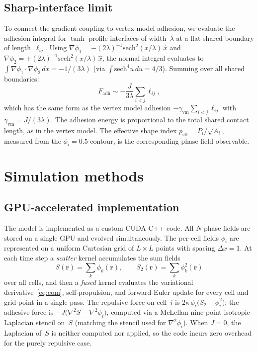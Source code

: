 \documentclass[aps,pre,twocolumn,superscriptaddress,longbibliography,floatfix]{revtex4-2}
\newcommand{\peff}{p_{\mathrm{eff}}}       %
\newcommand{\phii}{\phi_i}                 %
\begin{document}
\subsection{Sharp-interface limit}
\label{sec:model:sharp}

To connect the gradient coupling to vertex model adhesion, we evaluate
the adhesion integral for $\tanh$-profile
interfaces of width~$\lambda$ at a flat shared boundary of
length~$\ell_{ij}$.  Using
$\nabla\phi_1 = -(2\lambda)^{-1}\mathrm{sech}^2(x/\lambda)\,\hat{x}$
and $\nabla\phi_2 = +(2\lambda)^{-1}\mathrm{sech}^2(x/\lambda)\,\hat{x}$,
the normal integral evaluates to
$\int\! \nabla\phi_1\!\cdot\!\nabla\phi_2\,dx = -1/(3\lambda)$
(via $\int\!\mathrm{sech}^4 u\,du = 4/3$).  Summing over all shared
boundaries:
%
\begin{equation}
  F_{\mathrm{adh}} \sim -\frac{J}{3\lambda}\sum_{i<j}\ell_{ij},
  \label{eq:sharp-interface}
\end{equation}
%
which has the same form as the vertex model adhesion
$-\gamma_{\mathrm{vm}}\sum_{i<j}\ell_{ij}$ with
$\gamma_{\mathrm{vm}} = J/(3\lambda)$.  The adhesion energy is
proportional to the total shared contact length, as in the
vertex model.  The effective shape index
$\peff = P_i/\sqrt{A_i}$, measured from the $\phii = 0.5$ contour,
is the corresponding phase field observable.


\section{Simulation methods}
\label{sec:methods}

\subsection{GPU-accelerated implementation}
\label{sec:methods:gpu}

The model is implemented as a custom CUDA C++ code.  All $N$ phase fields
are stored on a single GPU and evolved simultaneously.  The per-cell fields
$\phii$ are represented on a uniform Cartesian grid of $L \times L$ points
with spacing $\Delta x = 1$.  At each time step a \emph{scatter} kernel
accumulates the sum fields
%
\begin{equation}
  S(\bm{r}) = \textstyle\sum_k \phi_k(\bm{r}), \qquad
  S_2(\bm{r}) = \textstyle\sum_k \phi_k^2(\bm{r})
  \label{eq:sum-fields}
\end{equation}
%
over all cells, and then a \emph{fused} kernel evaluates the
variational derivative~\eqref{eq:eom}, self-propulsion, and
forward-Euler update for every cell and grid point in a single pass.
The repulsive force on cell~$i$ is
$2\kappa\,\phii\bigl(S_2 - \phii^2\bigr)$; the adhesive force is
$-J\bigl(\nabla^2 S - \nabla^2\phii\bigr)$, computed via a
McLellan nine-point isotropic Laplacian stencil on~$S$ (matching the
stencil used for $\nabla^2\phii$).  When $J = 0$, the Laplacian of~$S$ is neither
computed nor applied, so the code incurs zero overhead for the purely
repulsive case.
\end{document}
